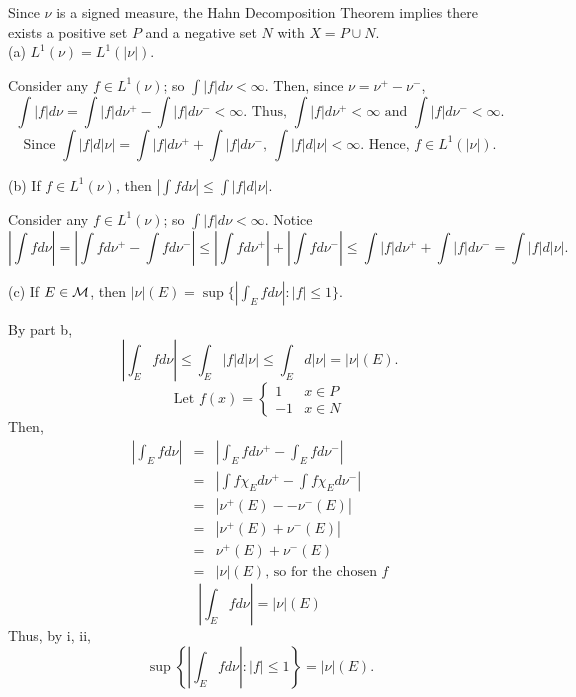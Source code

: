 \begin{enumerate}
Since $\nu$ is a signed measure, the Hahn Decomposition Theorem implies there exists a positive set $P$ and a negative set $N$ with $X=P\cup N$.\\
(a) $L^1(\nu)=L^1(|\nu|)$.
\begin{pf}
Consider any $f \in L^1(\nu)$; so $\int |f| d\nu < \infty$. Then, since $\nu = \nu^+ - \nu^-$, 
\[
\int |f| d\nu = \int |f|d \nu^+ - \int |f| d \nu^- < \infty. \text{ Thus, } \int |f|d \nu^+< \infty \text{ and } \int |f|d \nu^-< \infty.
\]
\[
\text{Since } \int |f| d |\nu| = \int |f|d\nu^+ + \int |f|d\nu^-, \ \int |f| d |\nu| <\infty. \text{ Hence, } f \in L^1(|\nu|).
\]
\end{pf}
(b) If $f \in L^1(\nu)$, then $|\int f d\nu| \leq \int |f|d |\nu|$.
\begin{pf}
	Consider any $f \in L^1(\nu)$; so $\int |f| d\nu < \infty$. Notice
	\[
	\left|\int f d\nu\right|= \left|\int fd\nu^+- \int f d \nu^-\right| \leq \left|\int fd\nu^+\right|+\left| \int f d \nu^-\right|\leq \int |f| d \nu^+ + \int |f| d \nu^- = \int |f| d |\nu|.\]
\end{pf}
(c) If $E \in {\mathcal M}$, then $|\nu|(E)=\sup \{ |\int_E f d \nu|:|f| \leq 1 \}$.
\begin{pf}
By part b, 
\begin{equation}\tag{i}
	\left|\int_E f d \nu\right|\leq \int_E |f|d |\nu|\leq \int_E d |\nu|=|\nu|(E).
\end{equation}
\[
\text{Let } f(x) = \left\{
\begin{array}{ll}
1 & x \in P \\
-1 & x \in N
\end{array} \right.
\]
Then, 
\begin{eqnarray*}
\left|\int_E f d \nu \right| &=& \left|\int_E f d \nu^+ - \int_E f d \nu^- \right|\\
&=& \left|\int f \chi_E d \nu^+ - \int f \chi_E d \nu^- \right|\\
&=& \left| \nu^+(E) - -\nu^-(E) \right|\\
&=& \left| \nu^+(E) +\nu^-(E) \right|\\
&=&  \nu^+(E) +\nu^-(E) \\
&=&  |\nu|(E) \text{, so for the chosen } f
\end{eqnarray*}
\begin{equation}\tag{ii}
	\left|\int_E f d \nu \right| = |\nu|(E)
\end{equation}
Thus, by i, ii, 
\[
\sup \left\{ \left|\int_E f d \nu \right|: |f| \leq 1 \right\} =  |\nu|(E).
\]	
\end{pf}

\end{enumerate}
